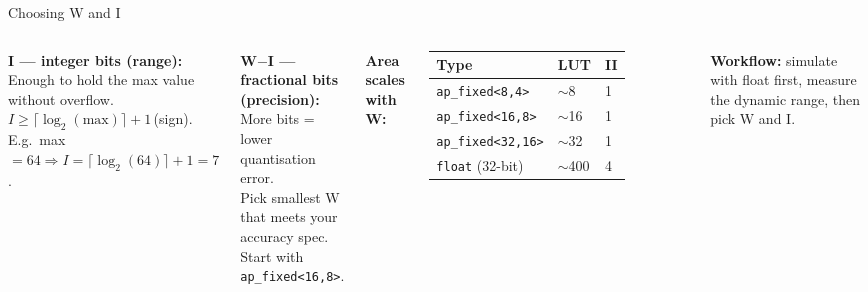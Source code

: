 \documentclass[aspectratio=169,12pt]{beamer}
\begin{document}
\begin{frame}{Choosing W and I}
\vspace{0.1cm}
\begin{columns}[T,totalwidth=\textwidth]


  \colorbox{Navy!8}{\parbox{\dimexpr\linewidth-2\fboxsep\relax}{\vspace{3pt}
    {\color{Navy}\bfseries I — integer bits (range):}\\[2pt]
    {\small Enough to hold the max value without overflow.\\[1pt]
    $I \geq \lceil\log_2(\text{max})\rceil + 1$\,(sign).\\[1pt]
    E.g.\ max $= 64 \Rightarrow I = \lceil\log_2(64)\rceil + 1 = 7$.}
  \vspace{3pt}}}

  \vspace{6pt}
  \colorbox{Teal!10}{\parbox{\dimexpr\linewidth-2\fboxsep\relax}{\vspace{3pt}
    {\color{Teal}\bfseries W$-$I — fractional bits (precision):}\\[2pt]
    {\small More bits = lower quantisation error.\\[1pt]
    Pick smallest W that meets your accuracy spec.\\[1pt]
    Start with \texttt{ap\_fixed<16,8>}.}
  \vspace{3pt}}}


  \vspace{0.1cm}

  {\small\color{Navy}\bfseries Area scales with W:}
  \vspace{4pt}

  \begin{tabular}{lp{0.9cm}p{0.6cm}}
    \hline
    \rowcolor{Navy!10}\textbf{Type} & \textbf{LUT} & \textbf{II}\\
    \hline
    \texttt{ap\_fixed<8,4>}   & $\sim$8   & 1\\
    \rowcolor{Navy!5}\texttt{ap\_fixed<16,8>}  & $\sim$16  & 1\\
    \texttt{ap\_fixed<32,16>} & $\sim$32  & 1\\
    \rowcolor{Navy!5}\texttt{float} (32-bit)   & $\sim$400 & 4\\
    \hline
  \end{tabular}

  \vspace{8pt}
  {\small\color{Orange}\bfseries Workflow:} {\small simulate with float
  first, measure the dynamic range, then pick W and I.}

\end{columns}
\end{frame}
\end{document}
